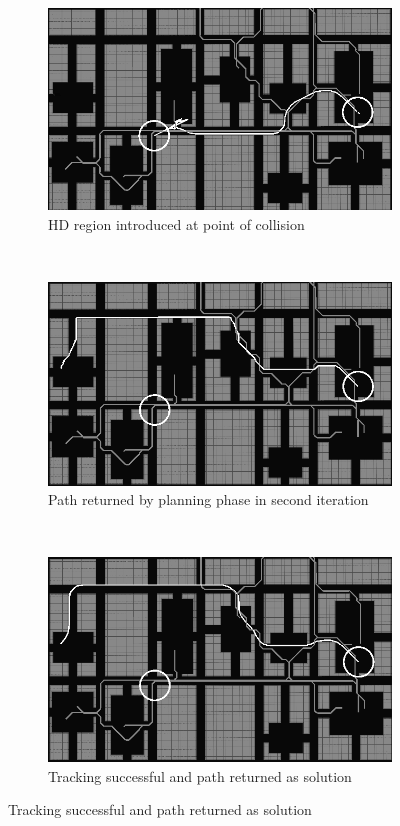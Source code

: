 \begin{figure}[ht]
  \begin{subfigure}[t]{0.3\linewidth}
    \centering
    \includegraphics[width=\linewidth]{Figures/alg4.png}
    \caption{HD region introduced at point of collision}
  \end{subfigure}
  ~
  \begin{subfigure}[t]{0.3\linewidth}
    \centering
    \includegraphics[width=\linewidth]{Figures/alg5.png}
    \caption{Path returned by planning phase in second iteration}
  \end{subfigure}
  ~
  \begin{subfigure}[t]{0.3\linewidth}
    \centering
    \includegraphics[width=\linewidth]{Figures/alg6.png}
    \caption{Tracking successful and path returned as solution}
  \end{subfigure}


\end{figure}
